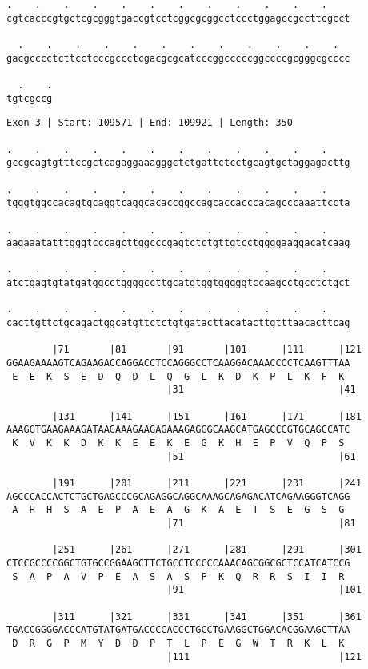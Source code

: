 \documentclass{article}
\begin{document}
\newpage
\begin{Verbatim}[fontfamily=courier]
  .    .    .    .    .    .    .    .    .    .    .    .  
cgtcacccgtgctcgcgggtgaccgtcctcggcgcggcctccctggagccgccttcgcct

  .    .    .    .    .    .    .    .    .    .    .    .  
gacgcccctcttcctcccgccctcgacgcgcatcccggcccccggccccgcgggcgcccc

  .    .
tgtcgccg
\end{Verbatim}
\newpage
\begin{Verbatim}[fontfamily=courier]
Exon 3 | Start: 109571 | End: 109921 | Length: 350

.    .    .    .    .    .    .    .    .    .    .    .    
gccgcagtgtttccgctcagaggaaagggctctgattctcctgcagtgctaggagacttg

.    .    .    .    .    .    .    .    .    .    .    .    
tgggtggccacagtgcaggtcaggcacaccggccagcaccacccacagcccaaattccta

.    .    .    .    .    .    .    .    .    .    .    .    
aagaaatatttgggtcccagcttggcccgagtctctgttgtcctggggaaggacatcaag

.    .    .    .    .    .    .    .    .    .    .    .    
atctgagtgtatgatggcctggggccttgcatgtggtgggggtccaagcctgcctctgct

.    .    .    .    .    .    .    .    .    .    .    .    
cacttgttctgcagactggcatgttctctgtgatacttacatacttgtttaacacttcag

        |71       |81       |91       |101      |111      |121
GGAAGAAAAGTCAGAAGACCAGGACCTCCAGGGCCTCAAGGACAAACCCCTCAAGTTTAA
 E  E  K  S  E  D  Q  D  L  Q  G  L  K  D  K  P  L  K  F  K 
                            |31                           |41

        |131      |141      |151      |161      |171      |181
AAAGGTGAAGAAAGATAAGAAAGAAGAGAAAGAGGGCAAGCATGAGCCCGTGCAGCCATC
 K  V  K  K  D  K  K  E  E  K  E  G  K  H  E  P  V  Q  P  S 
                            |51                           |61

        |191      |201      |211      |221      |231      |241
AGCCCACCACTCTGCTGAGCCCGCAGAGGCAGGCAAAGCAGAGACATCAGAAGGGTCAGG
 A  H  H  S  A  E  P  A  E  A  G  K  A  E  T  S  E  G  S  G 
                            |71                           |81

        |251      |261      |271      |281      |291      |301
CTCCGCCCCGGCTGTGCCGGAAGCTTCTGCCTCCCCCAAACAGCGGCGCTCCATCATCCG
 S  A  P  A  V  P  E  A  S  A  S  P  K  Q  R  R  S  I  I  R 
                            |91                           |101

        |311      |321      |331      |341      |351      |361
TGACCGGGGACCCATGTATGATGACCCCACCCTGCCTGAAGGCTGGACACGGAAGCTTAA
 D  R  G  P  M  Y  D  D  P  T  L  P  E  G  W  T  R  K  L  K 
                            |111                          |121

\end{Verbatim}
\end{document}
